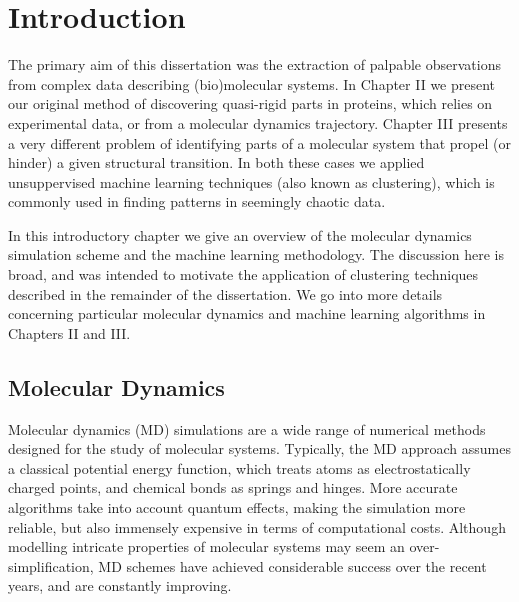 

\chapter{Introduction}

The primary aim of this dissertation was the extraction of palpable observations from complex data describing (bio)molecular systems.
In Chapter II we present our original method of discovering quasi-rigid parts in proteins, which relies on experimental data, or from a molecular dynamics trajectory.
Chapter III presents a very different problem of identifying parts of a molecular system that propel (or hinder) a given structural transition.
In both these cases we applied unsuppervised machine learning techniques (also known as clustering), which is commonly used in finding patterns in seemingly chaotic data.

In this introductory chapter we give an overview of the molecular dynamics simulation scheme and the machine learning methodology.
The discussion here is broad, and was intended to motivate the application of clustering techniques described in the remainder of the dissertation. %
We go into more details concerning particular molecular dynamics and machine learning algorithms in Chapters II and III.


\section{Molecular Dynamics}

Molecular dynamics (MD) simulations are a wide range of numerical methods designed for the study of molecular systems.
Typically, the MD approach assumes a classical potential energy function, which treats atoms as electrostatically charged points, and chemical bonds as springs and hinges.
More accurate algorithms take into account quantum effects, making the simulation more reliable, but also immensely expensive in terms of computational costs.
Although modelling intricate properties of molecular systems may seem an over-simplification, MD schemes have achieved considerable success over the recent years, and are constantly improving.

